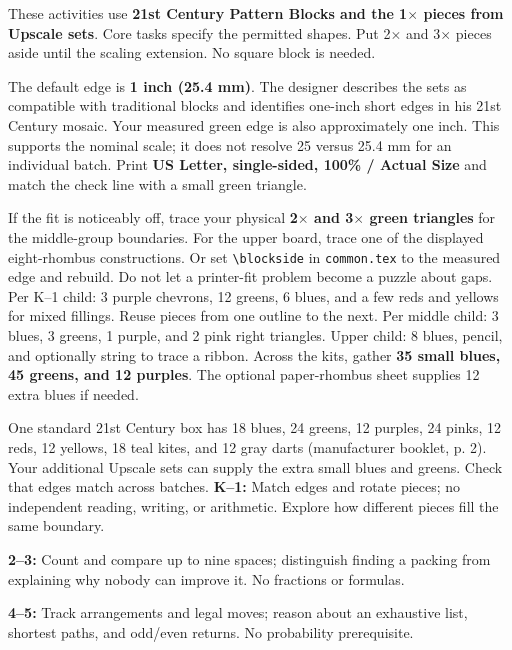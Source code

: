\documentclass[11pt]{article}
\begin{document}
These activities use \textbf{21st Century Pattern Blocks and the 1\(\times\) pieces from Upscale sets}. Core tasks specify the permitted shapes. Put 2\(\times\) and 3\(\times\) pieces aside until the scaling extension. No square block is needed.

The default edge is \textbf{1 inch (25.4 mm)}. The designer describes the sets as compatible with traditional blocks and identifies one-inch short edges in his 21st Century mosaic. Your measured green edge is also approximately one inch. This supports the nominal scale; it does not resolve 25 versus 25.4 mm for an individual batch. Print \textbf{US Letter, single-sided, 100\% / Actual Size} and match the check line with a small green triangle.

If the fit is noticeably off, trace your physical \textbf{2\(\times\) and 3\(\times\) green triangles} for the middle-group boundaries. For the upper board, trace one of the displayed eight-rhombus constructions. Or set \texttt{\textbackslash blockside} in \texttt{common.tex} to the measured edge and rebuild. Do not let a printer-fit problem become a puzzle about gaps.
Per K--1 child: 3 purple chevrons, 12 greens, 6 blues, and a few reds and yellows for mixed fillings. Reuse pieces from one outline to the next. Per middle child: 3 blues, 3 greens, 1 purple, and 2 pink right triangles. Upper child: 8 blues, pencil, and optionally string to trace a ribbon. Across the kits, gather \textbf{35 small blues, 45 greens, and 12 purples}. The optional paper-rhombus sheet supplies 12 extra blues if needed.

One standard 21st Century box has 18 blues, 24 greens, 12 purples, 24 pinks, 12 reds, 12 yellows, 18 teal kites, and 12 gray darts (manufacturer booklet, p. 2). Your additional Upscale sets can supply the extra small blues and greens. Check that edges match across batches.
\textbf{K--1:} Match edges and rotate pieces; no independent reading, writing, or arithmetic. Explore how different pieces fill the same boundary.\par
\textbf{2--3:} Count and compare up to nine spaces; distinguish finding a packing from explaining why nobody can improve it. No fractions or formulas.\par
\textbf{4--5:} Track arrangements and legal moves; reason about an exhaustive list, shortest paths, and odd/even returns. No probability prerequisite.
\end{document}
